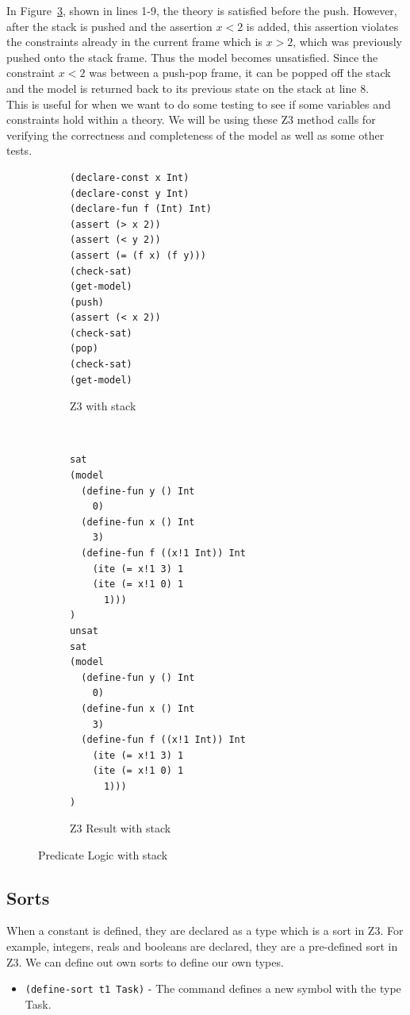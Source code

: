 \documentclass[a4paper]{report}
\begin{document}
In Figure~\ref{fig:Predicate Logic with stack}, shown in lines 1-9, the theory is satisfied before the push. However, after the stack is pushed and the assertion $x<2$ is added, this assertion violates the constraints already in the current frame which is $x > 2$, which was previously pushed onto the stack frame. Thus the model becomes unsatisfied. Since the constraint $x < 2$ was between a push-pop frame, it can be popped off the stack and the model is returned back to its previous state on the stack at line 8.\\

This is useful for when we want to do some testing to see if some variables and constraints hold within a theory. We will be using these Z3 method calls for verifying the correctness and completeness of the model as well as some other tests.

\begin{figure}[H]
\centering
\begin{subfigure}[b]{\textwidth}
\lstset{numbers=left, showspaces=false,
    showstringspaces=false, tabsize=2, breaklines=true,
    xleftmargin=5.0ex,
}
\lstset{basicstyle=\ttfamily}
\centering
\begin{lstlisting}[frame=single]
(declare-const x Int)
(declare-const y Int)
(declare-fun f (Int) Int)
(assert (> x 2))
(assert (< y 2))
(assert (= (f x) (f y)))
(check-sat)
(get-model)
(push)
(assert (< x 2))
(check-sat)
(pop)
(check-sat)
(get-model)
\end{lstlisting}
\caption{Z3 with stack}
\label{fig:Z3 with stack}
\end{subfigure}\\
\begin{subfigure}[b]{\textwidth}
\lstset{basicstyle=\ttfamily}
\begin{lstlisting}[frame=single]
sat
(model 
  (define-fun y () Int
    0)
  (define-fun x () Int
    3)
  (define-fun f ((x!1 Int)) Int
    (ite (= x!1 3) 1
    (ite (= x!1 0) 1
      1)))
)
unsat
sat
(model 
  (define-fun y () Int
    0)
  (define-fun x () Int
    3)
  (define-fun f ((x!1 Int)) Int
    (ite (= x!1 3) 1
    (ite (= x!1 0) 1
      1)))
)
\end{lstlisting}
\caption{Z3 Result with stack}
\label{fig:Z3 Function stack}
\end{subfigure}
\caption{Predicate Logic with stack}
\label{fig:Predicate Logic with stack}
\end{figure} 

\newpage

\subsection{Sorts}
When a constant is defined, they are declared as a type which is a sort in Z3. For example, integers, reals and booleans are declared, they are a pre-defined sort in Z3. We can define out own sorts to define our own types.
\begin{itemize}
\item \texttt{(define-sort t1 Task)} - The command defines a new symbol with the type Task.
\end{itemize}
\end{document}
